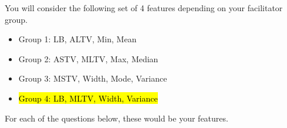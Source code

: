 \documentclass[../../main.tex]{subfiles}
\begin{document}
    \newpage

    You will consider the following set of 4 features depending on your facilitator group.

    \begin{itemize}
        \item Group 1: LB, ALTV, Min, Mean
        \item Group 2: ASTV, MLTV, Max, Median
        \item Group 3: MSTV, Width, Mode, Variance
        \item \hl{Group 4: LB, MLTV, Width, Variance}
    \end{itemize}

    For each of the questions below, these would be your features.
\end{document}
